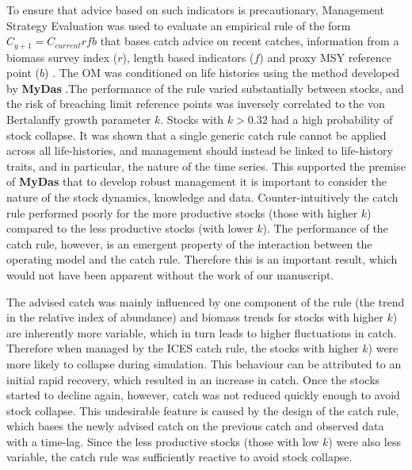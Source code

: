 To ensure that advice based on such indicators is precautionary, Management Strategy Evaluation was used to evaluate an empirical rule of the form $C_{y+1}=C_{current}rfb$ that bases catch advice on recent catches, information from a biomass survey index ($r$), length based indicators ($f$) and proxy MSY reference point ($b$) \citep{fischer2019hcr}. The OM was conditioned on life histories using the method developed by \textbf{MyDas} .The performance of the rule varied substantially between stocks, and the risk of breaching limit reference points was inversely correlated to the von Bertalanffy growth parameter $k$. Stocks with $k>0.32$  had a high probability of stock collapse. It was shown that a single generic catch rule cannot be applied across all life-histories, and management should instead be linked to life-history traits, and in particular, the nature of the time series. This supported the premise of \textbf{MyDas} that to develop robust management it is important to consider the nature of the stock dynamics, knowledge and data. 
Counter-intuitively the catch rule performed poorly for the more productive stocks (those with higher $k$) compared to the less productive stocks (with lower $k$). The performance of the catch rule, however, is an emergent property of the interaction between the operating model and the catch rule. Therefore this is an important result, which would not have been apparent without the work of our manuscript.

The advised catch was mainly influenced by one component of the rule (the trend in the relative index of abundance) and biomass trends for stocks with higher $k$) are inherently more variable, which in turn leads to higher fluctuations in catch. Therefore when managed by the ICES catch rule, the stocks with higher $k$) were more likely to collapse during simulation. This behaviour can be attributed to an initial rapid recovery, which resulted in an increase in catch. Once the stocks started to decline again, however, catch was not reduced quickly enough to avoid stock collapse. This undesirable feature is caused by the design of the catch rule, which bases the newly advised catch on the previous catch and observed data with a time-lag. Since the less productive stocks (those with low $k$) were also less variable, the catch rule was sufficiently reactive to avoid stock collapse.

